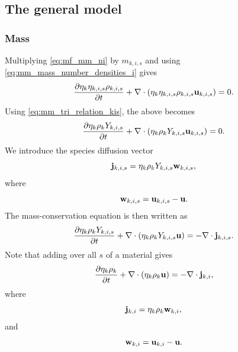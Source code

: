 \documentclass[a4paper,11pt]{report}
\begin{document}
\subsection{The general model}
\label{sec:sf_sm_ms_general}

\subsubsection{Mass}

Multiplying \cref{eq:mf_mm_ni} by $m_{k,i,s}$ and using \cref{eq:mm_mass_number_densities_i} gives
\begin{equation*}
    \frac{\partial \eta_k \eta_{k,i,s} \rho_{k,i,s}}{\partial t} + \nabla \cdot \left( \eta_k \eta_{k,i,s} \rho_{k,i,s} \mathbf{u}_{k,i,s} \right) = 0.
\end{equation*}
Using \cref{eq:mm_tri_relation_kis}, the above becomes
\begin{equation*}
    \frac{\partial \eta_k \rho_k Y_{k,i,s}}{\partial t} + \nabla \cdot \left( \eta_k \rho_k Y_{k,i,s} \mathbf{u}_{k,i,s} \right) = 0.
\end{equation*}
We introduce the species diffusion vector
\begin{equation}
    \label{eq:sf_species_diffusion_vector}
    \mathbf{j}_{k,i,s} = \eta_k \rho_k Y_{k,i,s} \mathbf{w}_{k,i,s},
\end{equation}
where 
\begin{equation}
    \label{eq:sf_species_velocity_shift}
    \mathbf{w}_{k,i,s} = \mathbf{u}_{k,i,s} - \mathbf{u}.
\end{equation}
The mass-conservation equation is then written as
\begin{equation*}
    \frac{\partial \eta_k \rho_k Y_{k,i,s}}{\partial t} + \nabla \cdot \left( \eta_k \rho_k Y_{k,i,s} \mathbf{u} \right) = -\nabla \cdot \mathbf{j}_{k,i,s}.
\end{equation*}
Note that adding over all $s$ of a material gives
\begin{equation*}
    \frac{\partial \eta_k \rho_k }{\partial t} + \nabla \cdot \left( \eta_k \rho_k \mathbf{u} \right) = -\nabla \cdot \mathbf{j}_{k,i},
\end{equation*}
where 
\begin{equation}
    \label{eq:sf_species_diffusion_vector_sum}
    \mathbf{j}_{k,i} = \eta_k \rho_k \mathbf{w}_{k,i},
\end{equation}
and
\begin{equation}
    \label{eq:sf_species_velocity_shift_sum}
    \mathbf{w}_{k,i} = \mathbf{u}_{k,i} - \mathbf{u}.
\end{equation}
\end{document}
